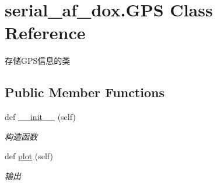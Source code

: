 \hypertarget{classserial__af__dox_1_1_g_p_s}{}\section{serial\+\_\+af\+\_\+dox.\+G\+PS Class Reference}
\label{classserial__af__dox_1_1_g_p_s}


存储\+G\+P\+S信息的类  


\subsection*{Public Member Functions}
\begin{DoxyCompactItemize}
\item 
def \hyperlink{classserial__af__dox_1_1_g_p_s_abbccf898ad305fb8d6c881e5697edd99}{\+\_\+\+\_\+init\+\_\+\+\_\+} (self)
\begin{DoxyCompactList}\small\item\em 构造函数 \end{DoxyCompactList}\item 
def \hyperlink{classserial__af__dox_1_1_g_p_s_afe58fd912e3959bb37461f06207e79a3}{plot} (self)
\begin{DoxyCompactList}\small\item\em 输出 \end{DoxyCompactList}\end{DoxyCompactItemize}
